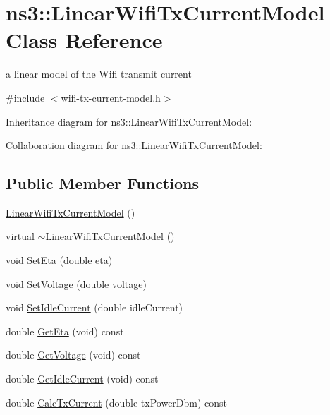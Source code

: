 \hypertarget{classns3_1_1LinearWifiTxCurrentModel}{}\section{ns3\+:\+:Linear\+Wifi\+Tx\+Current\+Model Class Reference}
\label{classns3_1_1LinearWifiTxCurrentModel}


a linear model of the Wifi transmit current  




{\ttfamily \#include $<$wifi-\/tx-\/current-\/model.\+h$>$}



Inheritance diagram for ns3\+:\+:Linear\+Wifi\+Tx\+Current\+Model\+:


Collaboration diagram for ns3\+:\+:Linear\+Wifi\+Tx\+Current\+Model\+:
\subsection*{Public Member Functions}
\begin{DoxyCompactItemize}
\item 
\hyperlink{classns3_1_1LinearWifiTxCurrentModel_a17ea1b5907a8d6cdfd07997487cd9893}{Linear\+Wifi\+Tx\+Current\+Model} ()
\item 
virtual \hyperlink{classns3_1_1LinearWifiTxCurrentModel_a8d81d2ce8bd3cc3fe72a4879e1403ef4}{$\sim$\+Linear\+Wifi\+Tx\+Current\+Model} ()
\item 
void \hyperlink{classns3_1_1LinearWifiTxCurrentModel_a6b5834040f52b26470904a5d0ad1f11d}{Set\+Eta} (double eta)
\item 
void \hyperlink{classns3_1_1LinearWifiTxCurrentModel_a329854d859903929d47933920df8b1a0}{Set\+Voltage} (double voltage)
\item 
void \hyperlink{classns3_1_1LinearWifiTxCurrentModel_ada72e108df30ab42cde59ed5aeb87846}{Set\+Idle\+Current} (double idle\+Current)
\item 
double \hyperlink{classns3_1_1LinearWifiTxCurrentModel_a5cc5bbbe7161bba9a13f1ee5a3e249bc}{Get\+Eta} (void) const 
\item 
double \hyperlink{classns3_1_1LinearWifiTxCurrentModel_a2f197328c785ab3e7c915f6388ad8933}{Get\+Voltage} (void) const 
\item 
double \hyperlink{classns3_1_1LinearWifiTxCurrentModel_a604f7ed3cd2adc7134d7f6a42591819c}{Get\+Idle\+Current} (void) const 
\item 
double \hyperlink{classns3_1_1LinearWifiTxCurrentModel_a433af3e97b24d40d4fd36529cbbede3f}{Calc\+Tx\+Current} (double tx\+Power\+Dbm) const 
\end{DoxyCompactItemize}
